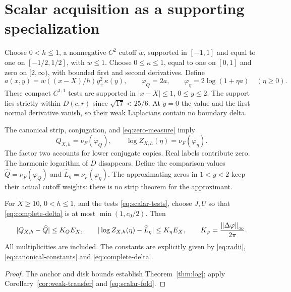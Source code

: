 \section{Scalar acquisition as a supporting specialization}\label{app:scalar}

Choose $0<h\le1$, a nonnegative $C^2$ cutoff $w$, supported in
$[-1,1]$ and equal to one on $[-1/2,1/2]$, with $w\le1$.
Choose $0\le\kappa\le1$, equal to one on $[0,1]$ and zero on
$[2,\infty)$, with bounded first and second derivatives. Define
\begin{equation}\label{eq:scalar-tests}
 a(x,y)=w((x-X)/h)y_+^2\kappa(y),\qquad
 \varphi_Q=2a,\qquad
 \varphi_\eta=2\log(1+\eta a)\quad(\eta\ge0).
\end{equation}
These compact $C^{1,1}$ tests are supported in
$|x-X|\le1$, $0\le y\le2$. The support lies strictly within
$D(c,r)$ since $\sqrt{17}<25/6$. At $y=0$ the value and the first
normal derivative vanish, so their weak Laplacians contain no
boundary delta.

The canonical strip, conjugation, and \eqref{eq:zero-measure} imply
\begin{equation}\label{eq:scalar-fold}
 Q_{X,h}=\nu_F(\varphi_Q),\qquad
 \log Z_{X,h}(\eta)=\nu_F(\varphi_\eta).
\end{equation}
The factor two accounts for lower conjugate copies. Real labels
contribute zero. The harmonic logarithm of $D$ disappears.
Define the comparison values
$\widehat Q=\nu_{\widehat F}(\varphi_Q)$ and
$\widehat L_\eta=\nu_{\widehat F}(\varphi_\eta)$.
The approximating zeros in $1<y<2$ keep their actual cutoff weights:
there is no strip theorem for the approximant.

\begin{theorem}\label{thm:scalar}
For $X\ge10$, $0<h\le1$, and the tests \eqref{eq:scalar-tests},
choose $J,U$ so that \eqref{eq:complete-delta} is at most
$\min(1,c_0/2)$. Then
\begin{equation}\label{eq:scalar-transfer}
 |Q_{X,h}-\widehat Q|\le K_QE_X,\qquad
 |\log Z_{X,h}(\eta)-\widehat L_\eta|\le K_\eta E_X,
 \qquad
 K_\varphi=\frac{\left\|\Delta\varphi\right\|_\infty}{2\pi}.
\end{equation}
All multiplicities are included. The constants are explicitly
given by \eqref{eq:radii}, \eqref{eq:canonical-constants} and
\eqref{eq:complete-delta}.
\end{theorem}
\begin{proof}
The anchor and disk bounds establish Theorem~\ref{thm:log};
apply Corollary~\ref{cor:weak-transfer} and \eqref{eq:scalar-fold}.
\end{proof}

